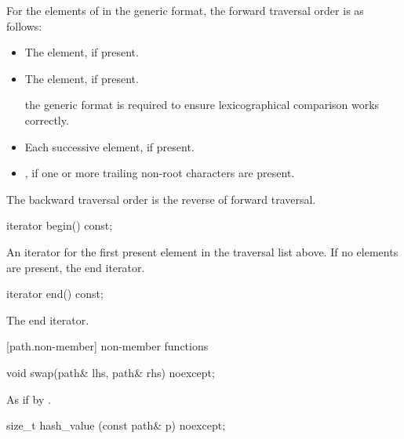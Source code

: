 \pnum
For the elements of  in the generic format,
the forward traversal order is as follows:
\begin{itemize}
\item The  element, if present.
\item The  element, if present.
\begin{note}
the generic format is required to ensure lexicographical
comparison works correctly. \end{note}
\item Each successive  element, if present.
\item {}, if one or more trailing non-root 
characters are present.
\end{itemize}

\pnum
The backward traversal order is the reverse of forward traversal.

\begin{itemdecl}
iterator begin() const;
\end{itemdecl}

\begin{itemdescr}
\pnum
\returns An iterator for the first present element in the traversal
list above. If no elements are present, the end iterator.
\end{itemdescr}

\begin{itemdecl}
iterator end() const;
\end{itemdecl}

\begin{itemdescr}
\pnum
\returns The end iterator.
\end{itemdescr}

[path.non-member]{ non-member functions}

\begin{itemdecl}
void swap(path& lhs, path& rhs) noexcept;
\end{itemdecl}

\begin{itemdescr}
\pnum
\effects As if by .
\end{itemdescr}

\begin{itemdecl}
size_t hash_value (const path& p) noexcept;
\end{itemdecl}

